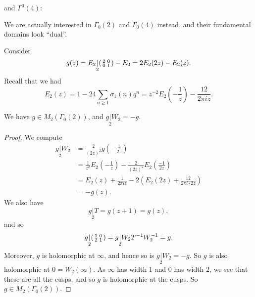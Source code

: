 \documentclass[a4paper]{article}
\begin{document}
and $\Gamma^0(4)$:
\begin{center}
\end{center}
We are actually interested in $\Gamma_0(2)$ and $\Gamma_0(4)$ instead, and their fundamental domains look ``dual''.

Consider
\[
  g(z) = E_2 \underset{2}{|}
  \begin{psmallmatrix}
    2 & 0\\
    0 & 1
  \end{psmallmatrix} - E_2 = 2 E_2(2z) - E_2(z).
\]
Recall that we had
\[
  E_2(z) = 1 - 24 \sum_{n \geq 1} \sigma_1(n) q^n = z^{-2} E_2 \left(-\frac{1}{z}\right) - \frac{12}{2\pi i z}.
\]
\begin{prop}
  We have $g \in M_2(\Gamma_0(2))$, and $g \underset{2}{|} W_2 = -g$.
\end{prop}

\begin{proof}
  We compute
  \begin{align*}
    g\underset{2}{|} W_2 &= \frac{2}{(2z)^2} g\left(-\frac{1}{2z}\right)\\
    &= \frac{1}{z^2} E_2\left(-\frac{1}{z}\right) - \frac{2}{(2z)^2} E_2\left(\frac{-1}{2z}\right)\\
    &= E_2(z) + \frac{1}{2\pi i z} - 2\left(E_2(2z) + \frac{12}{2\pi i \cdot 2z}\right)\\
    &= - g(z).
  \end{align*}
  We also have
  \[
    g\underset{2}{|}T = g(z + 1) = g(z),
  \]
  and so
  \[
    g \underset{2}{|}
    \begin{psmallmatrix}
      1 & 0\\
      2 & 1
    \end{psmallmatrix} = g \underset{2}{|} W_2 T^{-1} W_2^{-1} = g.
  \]
  Moreover, $g$ is holomorphic at $\infty$, and hence so is $g \underset{2}{|} W_2 = -g$. So $g$ is also holomorphic at $0 = W_2(\infty)$. As $\infty$ has width $1$ and $0$ has width $2$, we see that these are all the cusps, and so $g$ is holomorphic at the cusps. So $g \in M_2(\Gamma_0(2))$.
\end{proof}
\end{document}
